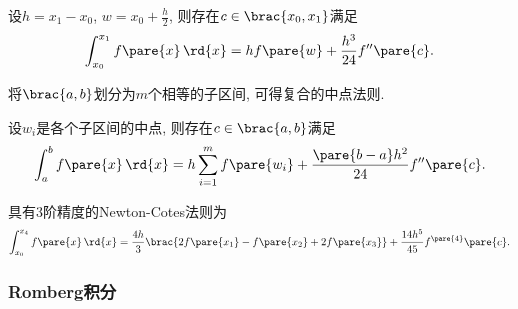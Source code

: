 \documentclass{ctexart}
\begin{document}
\begin{theorem}[中点法则]
    设$\displaystyle h = x_1 - x_0$, $\displaystyle w = x_0 + \frac{h}{2}$, 则存在$c\in\brac{x_0,x_1}$满足
    \[ \int_{x_0}^{x_1}f\pare{x}\,\rd{x} = hf\pare{w} + \frac{h^3}{24}f''\pare{c}. \]
\end{theorem}
将$\brac{a,b}$划分为$m$个相等的子区间, 可得复合的中点法则.
\begin{theorem}[复合中点法则]
    设$w_i$是各个子区间的中点, 则存在$c\in\brac{a,b}$满足
    \[ \int_a^b f\pare{x}\,\rd{x} = h\sum_{i=1}^m f\pare{w_i} + \frac{\pare{b-a}h^2}{24}f''\pare{c}. \]
\end{theorem}
具有3阶精度的Newton-Cotes法则为
\[ \int_{x_0}^{x_4} f\pare{x}\,\rd{x} = \frac{4h}{3}\brac{2f\pare{x_1} - f\pare{x_2} + 2f\pare{x_3}} + \frac{14h^5}{45}f^{\pare{4}}\pare{c}. \]


\subsubsection{Romberg积分} %
\label{ssub:romberg积分}
\end{document}

